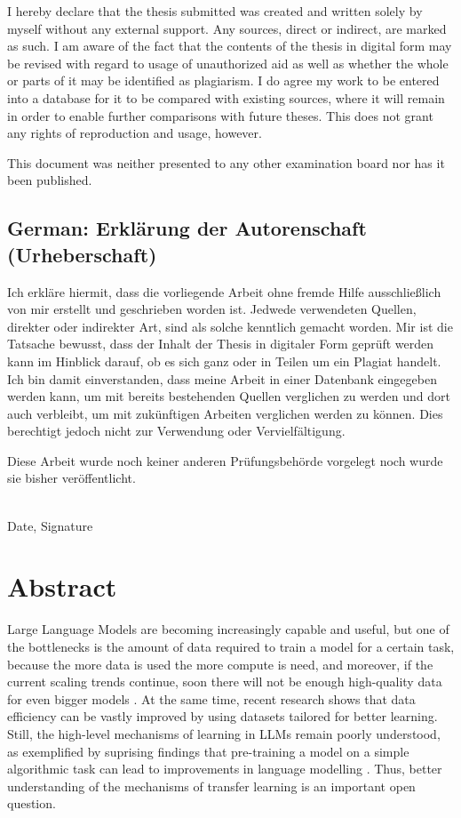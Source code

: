 \documentclass[a4paper, 11pt, oneside]{article}
\begin{document}
	I hereby declare that the thesis submitted was created and written solely by
	myself without any external support. Any sources, direct or indirect, are marked
	as such. I am aware of the fact that the contents of the thesis in digital
	form may be revised with regard to usage of unauthorized aid as well as
	whether the whole or parts of it may be identified as plagiarism. I do agree my
	work to be entered into a database for it to be compared with existing sources,
	where it will remain in order to enable further comparisons with future theses.
	This does not grant any rights of reproduction and usage, however.

	This document was neither presented to any other examination board nor has it
	been published.

	\subsection*{German: Erklärung der Autorenschaft (Urheberschaft)}

	Ich erkläre hiermit, dass die vorliegende Arbeit ohne fremde Hilfe
	ausschließlich von mir erstellt und geschrieben worden ist. Jedwede verwendeten
	Quellen, direkter oder indirekter Art, sind als solche kenntlich gemacht worden.
	Mir ist die Tatsache bewusst, dass der Inhalt der Thesis in digitaler Form geprüft
	werden kann im Hinblick darauf, ob es sich ganz oder in Teilen um ein Plagiat
	handelt. Ich bin damit einverstanden, dass meine Arbeit in einer Datenbank
	eingegeben werden kann, um mit bereits bestehenden Quellen verglichen zu werden
	und dort auch verbleibt, um mit zukünftigen Arbeiten verglichen werden zu
	können. Dies berechtigt jedoch nicht zur Verwendung oder Vervielfältigung.

	Diese Arbeit wurde noch keiner anderen Prüfungsbehörde vorgelegt noch wurde sie
	bisher veröffentlicht.

	\vspace{20mm}

	\dotfill\\ Date, Signature

	\newpage

	\section*{Abstract}
	Large Language Models are becoming increasingly capable and useful, but one of
	the bottlenecks is the amount of data required to train a model for a certain task,
	because the more data is used the more compute is need, and moreover, if the
	current scaling trends continue, soon there will not be enough high-quality data
	for even bigger models \cite{villalobos2022will}. At the same time, recent research
	shows \cite{eldan2023tinystories} \cite{gunasekar2023textbooks} that data efficiency
	can be vastly improved by using datasets tailored for better learning. Still, the
	high-level mechanisms of learning in LLMs remain poorly understood, as
	exemplified by suprising findings that pre-training a model on a simple
	algorithmic task can lead to improvements in language modelling
	\cite{papadimitriou2020learning}. Thus, better understanding of the mechanisms
	of transfer learning is an important open question.
\end{document}
